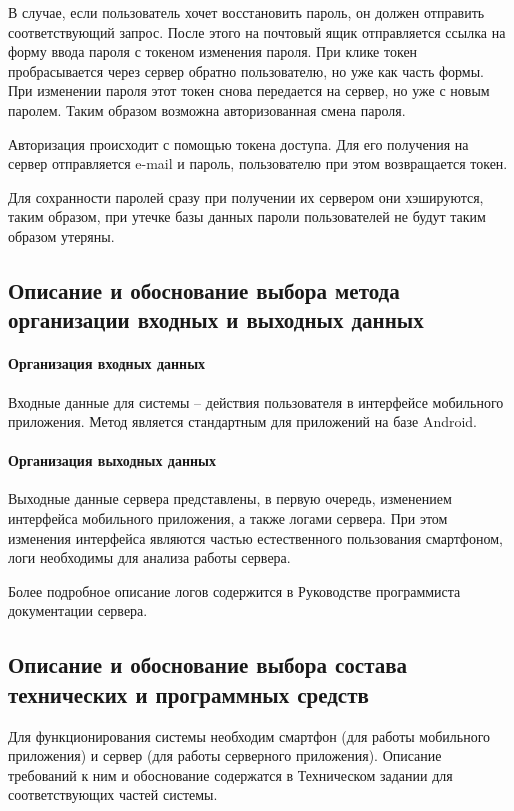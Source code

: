 \documentclass[explnote]{espd}
\begin{document}
В случае, если пользователь хочет восстановить пароль, он должен отправить соответствующий запрос. После этого на почтовый ящик отправляется ссылка на форму ввода пароля с токеном изменения пароля. При клике токен пробрасывается через сервер обратно пользователю, но уже как часть формы. При изменении пароля этот токен снова передается на сервер, но уже с новым паролем. Таким образом возможна авторизованная смена пароля.

Авторизация происходит с помощью токена доступа. Для его получения на сервер отправляется e-mail и пароль, пользователю при этом возвращается токен.

Для сохранности паролей сразу при получении их сервером они хэшируются, таким образом, при утечке базы данных пароли пользователей не будут таким образом утеряны.

\subsection{Описание и обоснование выбора метода организации входных и выходных данных}
\paragraph{Организация входных данных}
Входные данные для системы -- действия пользователя в интерфейсе мобильного приложения. Метод является стандартным для приложений на базе Android.

\paragraph{Организация выходных данных}\label{paragraph:output}
Выходные данные сервера представлены, в первую очередь, изменением интерфейса мобильного приложения, а также логами сервера. При этом изменения интерфейса являются частью естественного пользования смартфоном, логи необходимы для анализа работы сервера.

Более подробное описание логов содержится в Руководстве программиста документации сервера.

\subsection{Описание и обоснование выбора состава технических и программных средств}
Для функционирования системы необходим смартфон (для работы мобильного приложения) и сервер (для работы серверного приложения). Описание требований к ним и обоснование содержатся в Техническом задании для соответствующих частей системы.
\end{document}
